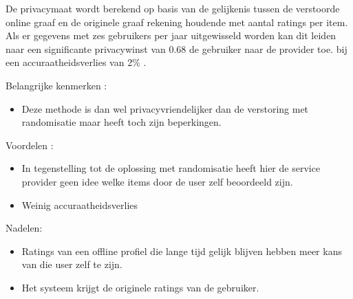 De privacymaat wordt berekend op basis van de gelijkenis tussen de verstoorde online graaf en de originele graaf rekening houdende met aantal ratings per item. 
Als er gegevens met zes gebruikers per jaar uitgewisseld worden kan dit leiden naar een significante privacywinst van 0.68 de gebruiker naar de provider toe. bij een accuraatheidsverlies van 2\% . 


Belangrijke kenmerken :
\begin{itemize}
 
\item Deze methode is dan wel privacyvriendelijker dan de verstoring met randomisatie maar heeft toch zijn beperkingen.
\end{itemize}
Voordelen : 
\begin{itemize}
\item In tegenstelling tot de oplossing met randomisatie heeft hier de service provider geen idee welke items door de user zelf beoordeeld zijn. 
\item Weinig accuraatheidsverlies
\end{itemize}
Nadelen:
\begin{itemize}
\item Ratings van een offline profiel die lange tijd gelijk blijven hebben meer kans van die user zelf te zijn.
\item Het systeem krijgt de originele ratings van de gebruiker.

\end{itemize}
